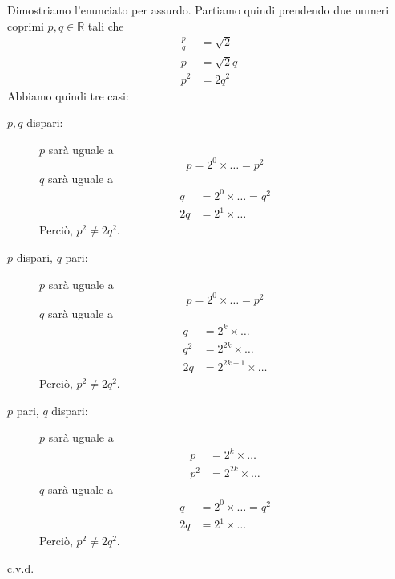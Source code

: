 \documentclass[../../dimostrazioni]{subfiles}
\begin{document}
            Dimostriamo l'enunciato per assurdo.
            Partiamo quindi prendendo due numeri coprimi \(p, q \in \mathbb{R}\) tali che
            \begin{align*}
                \frac{p}{q} &= \sqrt{2}\\
                p &= \sqrt{2} q\\
                p^2 &= 2 q^2
            \end{align*}
            Abbiamo quindi tre casi:
            \begin{description}
                \item[\(p, q\) dispari:]
                    \(p\) sarà uguale a
                    \[
                        p = 2^0 \times \dots = p^2
                    \]
                    \(q\) sarà uguale a
                    \begin{align*}
                        q &= 2^0 \times \dots = q^2\\
                        2q &= 2^1 \times \dots
                    \end{align*}
                    Perciò, \(p^2 \neq 2q^2\).
                \item[\(p\) dispari, \(q\) pari:]
                    \(p\) sarà uguale a
                    \[
                        p = 2^0 \times \dots = p^2
                    \]
                    \(q\) sarà uguale a
                    \begin{align*}
                        q &= 2^k \times \dots\\
                        q^2 &= 2^{2k} \times \dots\\
                        2q &= 2^{2k + 1} \times \dots
                    \end{align*}
                    Perciò, \(p^2 \neq 2q^2\).
                \newpage
                \item[\(p\) pari, \(q\) dispari:]
                    \(p\) sarà uguale a
                    \begin{align*}
                        p &= 2^k \times \dots\\
                        p^2 &= 2^{2k} \times \dots
                    \end{align*}
                    \(q\) sarà uguale a
                    \begin{align*}
                        q &= 2^0 \times \dots = q^2\\
                        2q &= 2^1 \times \dots
                    \end{align*}
                    Perciò, \(p^2 \neq 2q^2\).
            \end{description}
            c.v.d.
            
\end{document}
